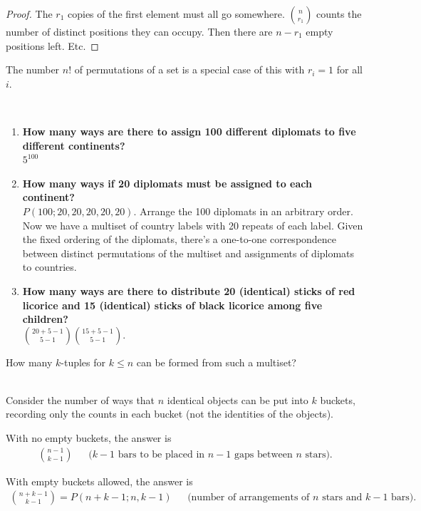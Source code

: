 \begin{proof}
  The $r_1$ copies of the first element must all go somewhere. ${n \choose r_1}$ counts the number
  of distinct positions they can occupy. Then there are $n - r_1$ empty positions left. Etc.
\end{proof}

\begin{remark*}
  The number $n!$ of permutations of a set is a special case of this with $r_i = 1$ for all $i$.
\end{remark*}

\begin{example*}~\\
  \begin{enumerate}
  \item {\bf How many ways are there to assign 100 different diplomats to five different
      continents?}\\
    $5^{100}$
  \item {\bf How many ways if 20 diplomats must be assigned to each continent?}\\
    $P(100; 20, 20, 20, 20, 20)$. Arrange the 100 diplomats in an arbitrary order. Now we have a
    multiset of country labels with 20 repeats of each label. Given the fixed ordering of the
    diplomats, there's a one-to-one correspondence between distinct permutations of the multiset
    and assignments of diplomats to countries.
  \item {\bf How many ways are there to distribute 20 (identical) sticks of red licorice and 15
    (identical) sticks of black licorice among five children?}\\
  ${20 + 5 -1 \choose 5 - 1}$${15 + 5 -1 \choose 5 - 1}$.
  \end{enumerate}
\end{example*}

\begin{theorem*}
  How many $k$-tuples for $k \leq n$ can be formed from such a multiset?
\end{theorem*}

\begin{theorem*}~\\
  Consider the number of ways that $n$ identical objects can be put into $k$ buckets, recording
  only the counts in each bucket (not the identities of the objects).

  With no empty buckets, the answer is
  \begin{align*}
    {n - 1 \choose k - 1} ~~~~~~~\text{($k-1$ bars to be placed in $n-1$ gaps between $n$ stars)}.
  \end{align*}

  With empty buckets allowed, the answer is
  \begin{align*}
    {n + k - 1 \choose k - 1} = P(n + k - 1; n, k - 1)~~~~~~~\text{(number of arrangements of $n$ stars and $k-1$ bars)}.
  \end{align*}
\end{theorem*}

